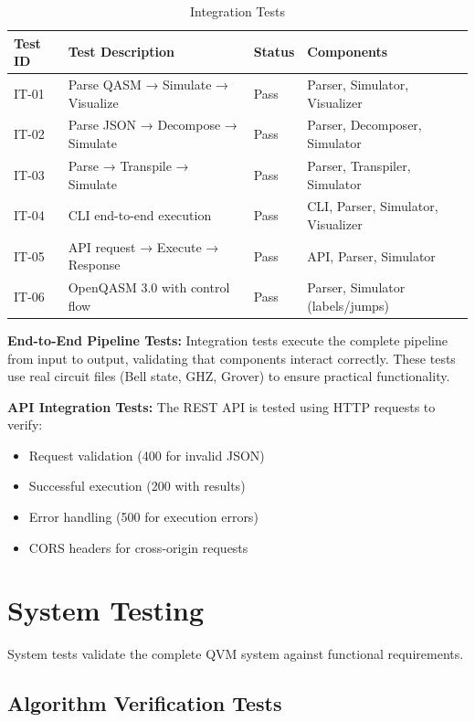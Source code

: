 \begin{table}[h]
\centering
\caption{Integration Tests}
\begin{tabular}{|p{2cm}|p{6cm}|p{2cm}|p{2.5cm}|}
\hline
\textbf{Test ID} & \textbf{Test Description} & \textbf{Status} & \textbf{Components} \\
\hline
IT-01 & Parse QASM → Simulate → Visualize & Pass & Parser, Simulator, Visualizer \\
\hline
IT-02 & Parse JSON → Decompose → Simulate & Pass & Parser, Decomposer, Simulator \\
\hline
IT-03 & Parse → Transpile → Simulate & Pass & Parser, Transpiler, Simulator \\
\hline
IT-04 & CLI end-to-end execution & Pass & CLI, Parser, Simulator, Visualizer \\
\hline
IT-05 & API request → Execute → Response & Pass & API, Parser, Simulator \\
\hline
IT-06 & OpenQASM 3.0 with control flow & Pass & Parser, Simulator (labels/jumps) \\
\hline
\end{tabular}
\end{table}

\textbf{End-to-End Pipeline Tests:} Integration tests execute the complete pipeline from input to output, validating that components interact correctly. These tests use real circuit files (Bell state, GHZ, Grover) to ensure practical functionality.

\textbf{API Integration Tests:} The REST API is tested using HTTP requests to verify:
\begin{itemize}
\item Request validation (400 for invalid JSON)
\item Successful execution (200 with results)
\item Error handling (500 for execution errors)
\item CORS headers for cross-origin requests
\end{itemize}

\section{System Testing}
System tests validate the complete QVM system against functional requirements.

\subsection{Algorithm Verification Tests}


